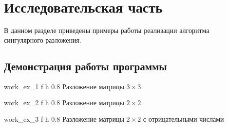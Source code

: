 \chapter{Исследовательская часть}
В данном разделе приведены примеры работы реализации алгоритма сингулярного разложения.

\section{Демонстрация работы программы}

{work_ex_1} %
{f} %
{h} %
{0.8\textwidth} %
{Разложение матрицы $3\times3$} %

{work_ex_2} %
{f} %
{h} %
{0.8\textwidth} %
{Разложение матрицы $2\times2$} %

{work_ex_3} %
{f} %
{h} %
{0.8\textwidth} %
{Разложение матрицы $2\times2$ с отрицательными числами} %

